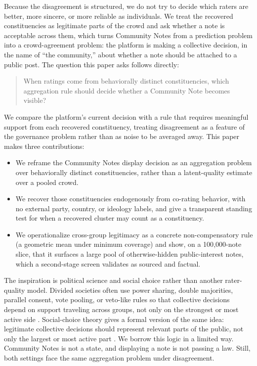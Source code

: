 \documentclass[10pt,twocolumn]{article}
\begin{document}
Because the disagreement is structured, we do not try to decide which raters are
better, more sincere, or more reliable as individuals. We treat the recovered
constituencies as legitimate parts of the crowd and ask whether a note is
acceptable across them, which turns Community Notes from a prediction problem
into a crowd-agreement problem: the platform is making a collective decision, in
the name of ``the community,'' about whether a note should be attached to a
public post. The question this paper asks follows directly:

\begin{quote}
When ratings come from behaviorally distinct constituencies, which aggregation
rule should decide whether a Community Note becomes visible?
\end{quote}

We compare the platform's current decision with a rule that requires meaningful
support from each recovered constituency, treating disagreement as a feature of
the governance problem rather than as noise to be averaged away. This paper makes
three contributions:

\begin{itemize}[nosep,leftmargin=1.2em]
    \item We reframe the Community Notes display decision as an aggregation
    problem over behaviorally distinct constituencies, rather than a
    latent-quality estimate over a pooled crowd.
    \item We recover those constituencies endogenously from co-rating
    behavior, with no external party, country, or ideology labels, and give a
    transparent standing test for when a recovered cluster may count as a
    constituency.
    \item We operationalize cross-group legitimacy as a concrete
    non-compensatory rule (a geometric mean under minimum coverage) and show, on
    a 100{,}000-note slice, that it surfaces a large pool of otherwise-hidden
    public-interest notes, which a second-stage screen validates as sourced and
    factual.
\end{itemize}

The inspiration is political science and social choice rather than another
rater-quality model. Divided societies often use power sharing, double
majorities, parallel consent, vote pooling, or veto-like rules so that
collective decisions depend on support traveling across groups, not only on the
strongest or most active side
\citep{lijphart1977democracy,mcgarryoleary2009,
horowitz1991makingmoderation,reilly2002electoral}. Social-choice theory gives
a formal version of the same idea: legitimate collective decisions should
represent relevant parts of the public, not only the largest or most active
part \citep{peters2019proportionality,qiu2025representative}. We borrow this
logic in a limited way. Community Notes is not a state, and displaying a note
is not passing a law. Still, both settings face the same aggregation problem
under disagreement.
\end{document}
